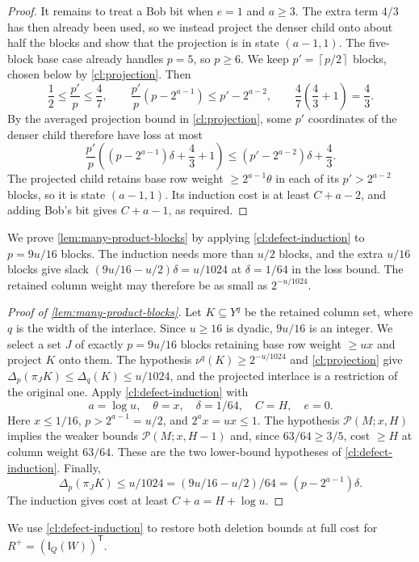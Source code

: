 \documentclass[11pt,letterpaper]{article} \usepackage[utf8]{inputenc}
\theoremstyle{plain} \newtheorem{theorem}{Theorem}[section]
\theoremstyle{definition} \newaliascnt{definition}{theorem}
\newcommand{\Int}[2]{\mathsf{I}_{#1}(#2)}
\newcommand{\RP}[3]{\mathcal{P}(#1;#2,#3)}
\newcommand{\ceil}[1]{\left\lceil#1\right\rceil}
\begin{document}
\begin{proof}
It remains to treat a Bob bit when \(e=1\) and \(a\ge3\). The extra term
\(4/3\) has then already been used, so we instead project the denser child onto
about half the blocks and show that the projection is in state \((a-1,1)\). The five-block base case already
handles \(p=5\), so \(p\ge6\). We keep \(p'=\ceil{p/2}\) blocks, chosen below by \cref{cl:projection}. Then
\[
\frac12\le\frac{p'}p\le\frac47,\qquad
\frac{p'}p(p-2^{a-1})\le p'-2^{a-2},\qquad
\frac47\left(\frac43+1\right)=\frac43.
\]
By the averaged projection bound in \cref{cl:projection}, some \(p'\)
coordinates of the denser child therefore have loss at most
\[
\frac{p'}p\left((p-2^{a-1})\delta+\frac43+1\right)
\le(p'-2^{a-2})\delta+\frac43.
\]
The projected child retains base row weight \(\ge2^{a-1}\theta\) in each
of its \(p'>2^{a-2}\) blocks, so it is state \((a-1,1)\). Its induction cost is at
least \(C+a-2\), and adding Bob's bit gives \(C+a-1\), as required.
\end{proof}

We prove \cref{lem:many-product-blocks} by applying \cref{cl:defect-induction}
to $p=9u/16$ blocks. The induction needs more than $u/2$ blocks, and the
extra $u/16$ blocks give slack $(9u/16-u/2)\delta=u/1024$ at $\delta=1/64$ in the
loss bound. The retained column weight may therefore be as small as $2^{-u/1024}$.

\begin{proof}[Proof of \cref{lem:many-product-blocks}]
\label{proof:lem:many-product-blocks}
Let $K\subseteq Y^q$ be the retained column set, where $q$ is the width of the
interlace. Since $u\ge16$ is dyadic, $9u/16$ is an integer. We select a set
$J$ of exactly $p=9u/16$ blocks retaining base row weight $\ge ux$ and project
$K$ onto them. The hypothesis $\nu^q(K)\ge2^{-u/1024}$ and \cref{cl:projection} give
$\Delta_p(\pi_JK)\le\Delta_q(K)\le u/1024$, and the projected interlace is a
restriction of the original one.
Apply \cref{cl:defect-induction} with
\[
a=\log u,\quad \theta=x,\quad \delta=1/64,\quad C=H,\quad e=0.
\]
Here $x\le1/16$, $p>2^{a-1}=u/2$, and $2^ax=ux\le1$.
The hypothesis $\RP{M}{x}{H}$ implies the weaker bounds $\RP{M}{x}{H-1}$
and, since $63/64\ge3/5$, cost $\ge H$ at column weight $63/64$. These are the
two lower-bound hypotheses of \cref{cl:defect-induction}. Finally,
\[
\Delta_p(\pi_JK)\le u/1024
=(9u/16-u/2)/64=(p-2^{a-1})\delta.
\]
The induction gives cost at least $C+a=H+\log u$.
\end{proof}

We use \cref{cl:defect-induction} to restore both deletion bounds at full cost for
$R^+=(\Int{Q}{W})^{\mathsf T}$.
\end{document}
